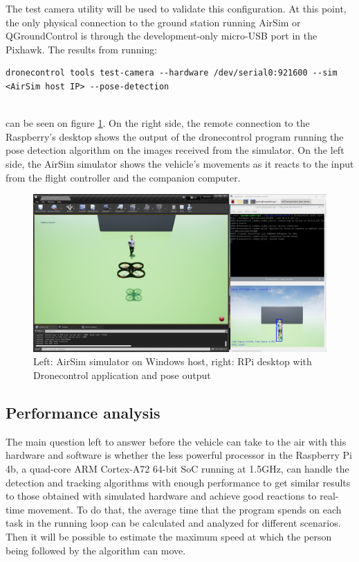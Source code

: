 The test camera utility will be used to validate this configuration.
At this point, the only physical connection to the ground station running AirSim or QGroundControl is through the development-only micro-USB port in the Pixhawk.
The results from running: \\
\begin{listing}[h!]
    \begin{verbatim}
dronecontrol tools test-camera --hardware /dev/serial0:921600 --sim <AirSim host IP> --pose-detection
    \end{verbatim}
\end{listing}\\
can be seen on figure \ref{fig:rpi-airsim-test}.
On the right side, the remote connection to the Raspberry's desktop shows the output of the dronecontrol program running the pose detection algorithm on the images received from the simulator.
On the left side, the AirSim simulator shows the vehicle's movements as it reacts to the input from the flight controller and the companion computer.

\begin{figure}
  \centering
  \includegraphics[width=\textwidth, keepaspectratio]{img/airsim-rpi-test.png}
  \caption{Left: AirSim simulator on Windows host, right: RPi desktop with Dronecontrol application and pose output}
  \label{fig:rpi-airsim-test}
\end{figure}

\subsection{Performance analysis}
\label{subsec:performance}

The main question left to answer before the vehicle can take to the air with this hardware and software is whether the less powerful processor in the Raspberry Pi 4b, a quad-core ARM Cortex-A72 64-bit SoC running at 1.5GHz, can handle the detection and tracking algorithms with enough performance to get similar results to those obtained with simulated hardware and achieve good reactions to real-time movement.
To do that, the average time that the program spends on each task in the running loop can be calculated and analyzed for different scenarios.
Then it will be possible to estimate the maximum speed at which the person being followed by the algorithm can move.

